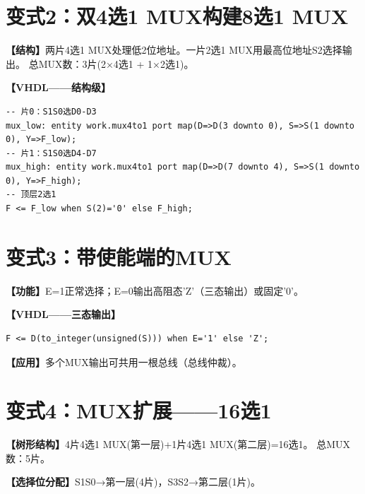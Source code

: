 \section{变式2：双4选1 MUX构建8选1 MUX}

\begin{detailbox}[完整教学]
\textbf{【结构】}两片4选1 MUX处理低2位地址。一片2选1 MUX用最高位地址S2选择输出。
总MUX数：3片(2×4选1 + 1×2选1)。

\textbf{【VHDL——结构级】}
\begin{lstlisting}
-- 片0：S1S0选D0-D3
mux_low: entity work.mux4to1 port map(D=>D(3 downto 0), S=>S(1 downto 0), Y=>F_low);
-- 片1：S1S0选D4-D7
mux_high: entity work.mux4to1 port map(D=>D(7 downto 4), S=>S(1 downto 0), Y=>F_high);
-- 顶层2选1
F <= F_low when S(2)='0' else F_high;
\end{lstlisting}
\end{detailbox}


\section{变式3：带使能端的MUX}

\begin{detailbox}[完整教学]
\textbf{【功能】}E=1正常选择；E=0输出高阻态'Z'（三态输出）或固定'0'。

\textbf{【VHDL——三态输出】}
\begin{lstlisting}
F <= D(to_integer(unsigned(S))) when E='1' else 'Z';
\end{lstlisting}

\textbf{【应用】}多个MUX输出可共用一根总线（总线仲裁）。
\end{detailbox}


\section{变式4：MUX扩展——16选1}

\begin{detailbox}[完整教学]
\textbf{【树形结构】}4片4选1 MUX(第一层)+1片4选1 MUX(第二层)=16选1。
总MUX数：5片。

\textbf{【选择位分配】}S1S0→第一层(4片)，S3S2→第二层(1片)。
\end{detailbox}
